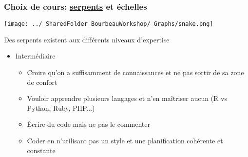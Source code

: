 \documentclass{beamer}
\begin{document}
    \begin{frame}
    
      \frametitle{Choix de cours: \uline{serpents} et échelles} \vspace{1cm}
      
        \begin{center}
        
          \texttt{[image: ../\_SharedFolder\_BourbeauWorkshop/\_Graphs/snake.png]}
         
        \end{center} 
        
  Des serpents existent aux différents niveaux d'expertise
      
    \begin{itemize}
        
      \item{Intermédiaire}
        
          \begin{itemize}
            \item Croire qu'on a suffisamment de connaissances et ne pas sortir de sa zone de confort
            \item Vouloir apprendre plusieurs langages et n'en maîtriser aucun (R vs Python, Ruby, PHP...)
            \item Écrire du code mais ne pas le commenter
            \item Coder en n'utilisant pas un style et une planification cohérente et constante 

          \end{itemize}
        
        \end{itemize}
        
     \end{frame}
  
\end{document}

